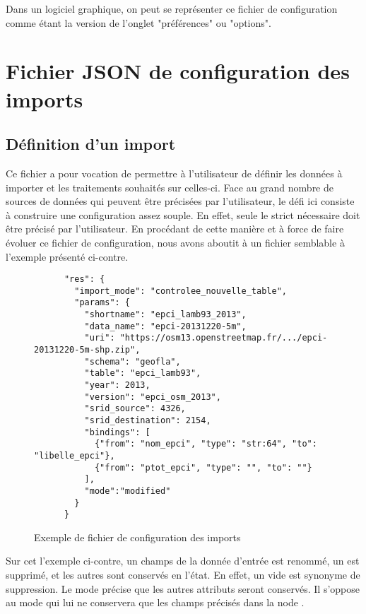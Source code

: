 Dans un logiciel graphique, on peut se représenter ce fichier de configuration comme étant la version  de l'onglet "préférences" ou "options".

\section{Fichier JSON de configuration des imports}
    \subsection{Définition d'un import}

  Ce fichier a pour vocation de permettre à l'utilisateur de définir les données à importer et les traitements souhaités sur celles-ci. Face au grand nombre de sources de données qui peuvent être précisées par l'utilisateur, le défi ici consiste à construire une configuration assez souple. En effet, seule le strict nécessaire doit être précisé par l'utilisateur. En procédant de cette manière et à force de faire évoluer ce fichier de configuration, nous avons aboutit à un fichier semblable à l'exemple présenté ci-contre.

  \begin{figure}
    \centering
    \begin{lstlisting}
      "res": {
        "import_mode": "controlee_nouvelle_table",
        "params": {
          "shortname": "epci_lamb93_2013",
          "data_name": "epci-20131220-5m",
          "uri": "https://osm13.openstreetmap.fr/.../epci-20131220-5m-shp.zip",
          "schema": "geofla",
          "table": "epci_lamb93",
          "year": 2013,
          "version": "epci_osm_2013",
          "srid_source": 4326,
          "srid_destination": 2154,
          "bindings": [
            {"from": "nom_epci", "type": "str:64", "to": "libelle_epci"},
            {"from": "ptot_epci", "type": "", "to": ""}
          ],
          "mode":"modified"
        }
      }
    \end{lstlisting}
    \caption{Exemple de fichier de configuration des imports}
  \end{figure}

Sur cet l'exemple ci-contre, un champs de la donnée d'entrée est renommé, un est supprimé, et les autres sont conservés en l'état. En effet, un  vide est synonyme de suppression. Le mode  précise que les autres attributs seront conservés. Il s'oppose au mode  qui lui ne conservera que les champs  précisés dans la node .


